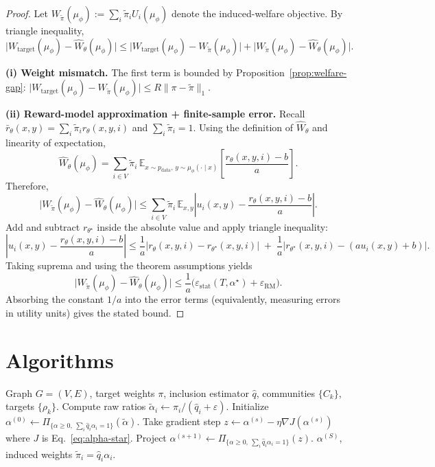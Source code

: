 \documentclass{article}
\theoremstyle{plain}
\theoremstyle{definition}
\theoremstyle{remark}
\begin{document}
\begin{proof}
Let $W_{\tilde\pi}(\mu_\phi):=\sum_i \tilde\pi_i U_i(\mu_\phi)$ denote the induced-welfare objective.
By triangle inequality,
\[
\big|W_{\mathrm{target}}(\mu_\phi)-\widehat{W}_\theta(\mu_\phi)\big|
\le
\big|W_{\mathrm{target}}(\mu_\phi)-W_{\tilde\pi}(\mu_\phi)\big|
+
\big|W_{\tilde\pi}(\mu_\phi)-\widehat{W}_\theta(\mu_\phi)\big|.
\]

\textbf{(i) Weight mismatch.}
The first term is bounded by Proposition~\ref{prop:welfare-gap}:
$\big|W_{\mathrm{target}}(\mu_\phi)-W_{\tilde\pi}(\mu_\phi)\big|\le R\|\pi-\tilde\pi\|_1$.

\textbf{(ii) Reward-model approximation + finite-sample error.}
Recall $\bar r_\theta(x,y)=\sum_i \tilde\pi_i r_\theta(x,y,i)$ and $\sum_i \tilde\pi_i=1$.
Using the definition of $\widehat{W}_\theta$ and linearity of expectation,
\[
\widehat{W}_\theta(\mu_\phi)
=
\sum_{i\in V}\tilde\pi_i\,
\mathbb{E}_{x\sim p_{\text{data}},\,y\sim\mu_\phi(\cdot\mid x)}
\left[\frac{r_\theta(x,y,i)-b}{a}\right].
\]
Therefore,
\[
\big|W_{\tilde\pi}(\mu_\phi)-\widehat{W}_\theta(\mu_\phi)\big|
\le
\sum_{i\in V}\tilde\pi_i\,
\mathbb{E}_{x,y}
\left|
u_i(x,y)-\frac{r_\theta(x,y,i)-b}{a}
\right|.
\]
Add and subtract $r_{\theta^\star}$ inside the absolute value and apply triangle inequality:
\[
\left|
u_i(x,y)-\frac{r_\theta(x,y,i)-b}{a}
\right|
\le
\frac{1}{a}\big|r_\theta(x,y,i)-r_{\theta^\star}(x,y,i)\big|
\;+\;
\frac{1}{a}\big|r_{\theta^\star}(x,y,i)-(a u_i(x,y)+b)\big|.
\]
Taking suprema and using the theorem assumptions yields
\[
\big|W_{\tilde\pi}(\mu_\phi)-\widehat{W}_\theta(\mu_\phi)\big|
\le
\frac{1}{a}\Big(\varepsilon_{\mathrm{stat}}(T,\alpha^\star)+\varepsilon_{\mathrm{RM}}\Big).
\]
Absorbing the constant $1/a$ into the error terms (equivalently, measuring errors in utility units) gives the stated bound.
\end{proof}

\section{Algorithms}
\label{app:algorithms}

\begin{algorithm}[h]
\caption{Graph-Balanced Aggregation (GBA) Weight Computation}
\label{alg:gba}
\begin{algorithmic}[1]
\REQUIRE Graph $G=(V,E)$, target weights $\pi$, inclusion estimator $\hat q$, communities $\{C_k\}$, targets $\{\rho_k\}$.
\STATE Compute raw ratios $\tilde\alpha_i \leftarrow \pi_i / (\hat q_i + \varepsilon)$.
\STATE Initialize $\alpha^{(0)} \leftarrow \Pi_{\{\alpha\ge 0,\ \sum_i \hat q_i\alpha_i=1\}}(\tilde\alpha)$.
    \STATE Take gradient step $z \leftarrow \alpha^{(s)} - \eta \nabla J(\alpha^{(s)})$ where $J$ is Eq.~\eqref{eq:alpha-star}.
    \STATE Project $\alpha^{(s+1)} \leftarrow \Pi_{\{\alpha\ge 0,\ \sum_i \hat q_i\alpha_i=1\}}(z)$.
\ENDFOR
\RETURN $\alpha^{(S)}$, induced weights $\tilde\pi_i = \hat q_i \alpha_i$.
\end{algorithmic}
\end{algorithm}
\end{document}
